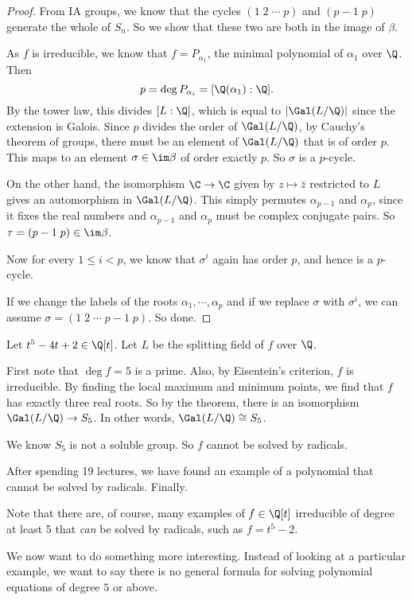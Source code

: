 \documentclass[a4paper]{article}
\begin{document}
\begin{proof}
  From IA groups, we know that the cycles $(1\; 2\; \cdots\; p)$ and $(p - 1\; p)$ generate the whole of $S_n$. So we show that these two are both in the image of $\beta$.

  As $f$ is irreducible, we know that $f = P_{\alpha_1}$, the minimal polynomial of $\alpha_1$ over $\Q$. Then
  \[
    p = \deg P_{\alpha_i} = [\Q(\alpha_1): \Q].
  \]
  By the tower law, this divides $[L:\Q]$, which is equal to $|\Gal(L/\Q)|$ since the extension is Galois. Since $p$ divides the order of $\Gal(L/\Q)$, by Cauchy's theorem of groups, there must be an element of $\Gal(L/\Q)$ that is of order $p$. This maps to an element $\sigma \in \im \beta$ of order exactly $p$. So $\sigma$ is a $p$-cycle.

  On the other hand, the isomorphism $\C \to \C$ given by $z \mapsto \bar{z}$ restricted to $L$ gives an automorphism in $\Gal(L/\Q)$. This simply permutes $\alpha_{p - 1}$ and $\alpha_p$, since it fixes the real numbers and $\alpha_{p - 1}$ and $\alpha_p$ must be complex conjugate pairs. So $\tau = (p - 1\; p) \in \im \beta$.

  Now for every $1 \leq i < p$, we know that $\sigma^i$ again has order $p$, and hence is a $p$-cycle.

  If we change the labels of the roots $\alpha_1, \cdots, \alpha_p$ and if we replace $\sigma$ with $\sigma^i$, we can assume $\sigma = (1\; 2\; \cdots \;p - 1\; p)$. So done.
\end{proof}

\begin{eg}
  Let $t^5 - 4t + 2 \in \Q[t]$. Let $L$ be the splitting field of $f$ over $\Q$.

  First note that $\deg f = 5$ is a prime. Also, by Eisentein's criterion, $f$ is irreducible. By finding the local maximum and minimum points, we find that $f$ has exactly three real roots. So by the theorem, there is an isomorphism $\Gal(L/\Q) \to S_5$. In other words, $\Gal(L/\Q) \cong S_5$.

  We know $S_5$ is not a soluble group. So $f$ cannot be solved by radicals.
\end{eg}
After spending 19 lectures, we have found an example of a polynomial that cannot be solved by radicals. Finally.

Note that there are, of course, many examples of $f \in \Q[t]$ irreducible of degree at least 5 that \emph{can} be solved by radicals, such as $f = t^5 - 2$.

We now want to do something more interesting. Instead of looking at a particular example, we want to say there is no general formula for solving polynomial equations of degree $5$ or above.
\end{document}
